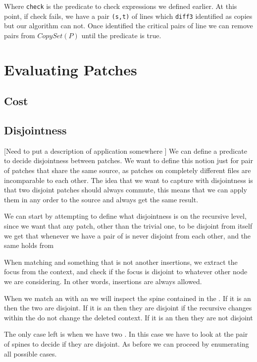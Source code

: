 \documentclass[11pt]{article}
\begin{document}
Where \texttt{check} is the predicate to check expressions we defined earlier. 
At this point, if check fails, we have a pair \texttt{(s,t)} of lines which 
\texttt{diff3} identified as copies but our algorithm can not. Once identified the critical pairs of line 
we can remove pairs from $CopySet(P)$ until the predicate is true. 

\section{Evaluating Patches} \label{evaluating-patches}
\subsection{Cost}\label{cost}

\subsection{Disjointness}\label{disj}
[Need to put a description of application somewhere ]
We can define a predicate to decide disjointness between patches. We want to define 
this notion just for pair of patches that share the same source, as patches on completely different files are 
incomparable to each other. 
The idea that we want to capture with disjointness is that two disjoint patches should always 
commute, this means that we can apply them in any order to the source and always get the same result.

We can start by attempting to define what disjointness is on the recursive 
level, since we want that any patch, other than the trivial one, to be disjoint 
from itself we get that whenever we have a pair of \alins is never disjoint from 
each other, and the same holds from \aldel

When matching and \alins something that is not another insertions, we extract 
the focus from the context, and check if the focus is disjoint to whatever other 
node we are considering. In other words, insertions are always allowed.

When we match an \aldel with an \alspn we 
will inspect the spine contained in the \alspn.
If it is an \scp then the two are disjoint.
If it is an \scns then they are disjoint if the recursive changes within the 
\scns do not change the deleted context.
If it is an \schg then they are not disjoint

The only case left is when we have two \alspn. In this case we have to look at 
the pair of spines to decide if they are disjoint. As before we can proceed by 
enumerating all possible cases.
\end{document}
